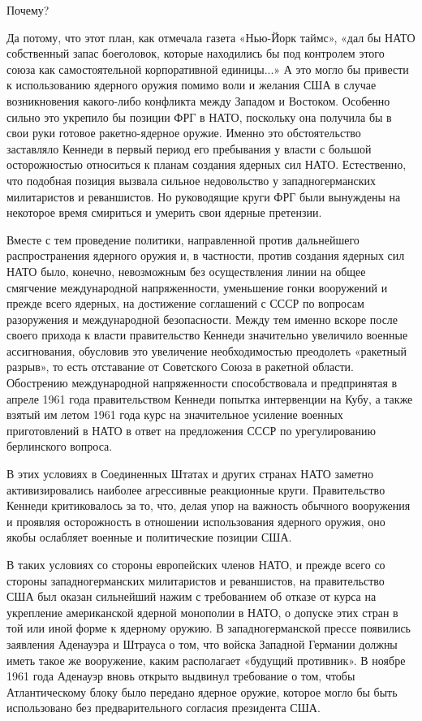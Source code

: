 \documentclass[12pt, a4paper, openany]{book}
\begin{document}
Почему?
	
Да потому, что этот план, как отмечала газета «Нью-Йорк таймс», «дал бы НАТО собственный запас боеголовок, которые находились бы под контролем этого союза как самостоятельной корпоративной единицы...» А это могло бы привести к использованию ядерного оружия помимо воли и желания США в случае возникновения какого-либо конфликта между Западом и Востоком. Особенно сильно это укрепило бы позиции ФРГ в НАТО, поскольку она получила бы в свои руки готовое ракетно-ядерное оружие. Именно это обстоятельство заставляло Кеннеди в первый период его пребывания у власти с большой осторожностью относиться к планам создания ядерных сил НАТО. Естественно, что подобная позиция вызвала сильное недовольство у западногерманских милитаристов и реваншистов. Но руководящие круги ФРГ были вынуждены на некоторое время смириться и умерить свои ядерные претензии.
	
Вместе с тем проведение политики, направленной против дальнейшего распространения ядерного оружия и, в частности, против создания ядерных сил НАТО было, конечно, невозможным без осуществления линии на общее смягчение международной напряженности, уменьшение гонки вооружений и прежде всего ядерных, на достижение соглашений с СССР по вопросам разоружения и международной безопасности. Между тем именно вскоре после своего прихода к власти правительство Кеннеди значительно увеличило военные ассигнования, обусловив это увеличение необходимостью преодолеть «ракетный разрыв», то есть отставание от Советского Союза в ракетной области. Обострению международной напряженности способствовала и предпринятая в апреле 1961 года правительством Кеннеди попытка интервенции на Кубу, а также взятый им летом 1961 года курс на значительное усиление военных приготовлений в НАТО в ответ на предложения СССР по урегулированию берлинского вопроса.
	
В этих условиях в Соединенных Штатах и других странах НАТО заметно активизировались наиболее агрессивные реакционные круги. Правительство Кеннеди критиковалось за то, что, делая упор на важность обычного вооружения и проявляя осторожность в отношении использования ядерного оружия, оно якобы ослабляет военные и политические позиции США.
	
В таких условиях со стороны европейских членов НАТО, и прежде всего со стороны западногерманских милитаристов и реваншистов, на правительство США был оказан сильнейший нажим с требованием об отказе от курса на укрепление американской ядерной монополии в НАТО, о допуске этих стран в той или иной форме к ядерному оружию. В западногерманской прессе появились заявления Аденауэра и Штрауса о том, что войска Западной Германии должны иметь такое же вооружение, каким располагает «будущий противник». В ноябре 1961 года Аденауэр вновь открыто выдвинул требование о том, чтобы Атлантическому блоку было передано ядерное оружие, которое могло бы быть использовано без предварительного согласия президента США.
	
\end{document}
